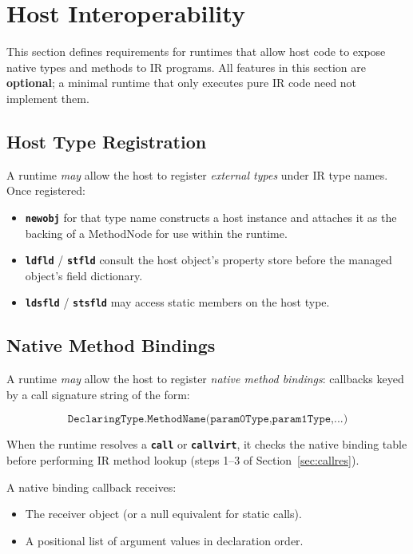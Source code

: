 \documentclass[11pt,a4paper]{article}
\newcommand{\opcode}[1]{\textbf{\texttt{#1}}}
\begin{document}
\section{Host Interoperability}
\label{sec:hostinterop}

This section defines requirements for runtimes that allow host code to
expose native types and methods to IR programs. All features in this section
are \textbf{optional}; a minimal runtime that only executes pure IR code
need not implement them.

\subsection{Host Type Registration}

A runtime \textit{may} allow the host to register \emph{external types}
under IR type names. Once registered:

\begin{itemize}[leftmargin=1.8em]
  \item \opcode{newobj} for that type name constructs a host instance and
    attaches it as the backing of a MethodNode for use within the runtime.
  \item \opcode{ldfld} / \opcode{stfld} consult the host object's property
    store before the managed object's field dictionary.
  \item \opcode{ldsfld} / \opcode{stsfld} may access static members on the
    host type.
\end{itemize}

\subsection{Native Method Bindings}

A runtime \textit{may} allow the host to register \emph{native method
bindings}: callbacks keyed by a call signature string of the form:

\[
\texttt{DeclaringType.MethodName(param0Type,param1Type,...)}
\]

When the runtime resolves a \opcode{call} or \opcode{callvirt}, it checks
the native binding table before performing IR method lookup (steps 1--3 of
Section~\ref{sec:callres}).

A native binding callback receives:
\begin{itemize}[leftmargin=1.8em, noitemsep]
  \item The receiver object (or a null equivalent for static calls).
  \item A positional list of argument values in declaration order.
\end{itemize}
\end{document}
